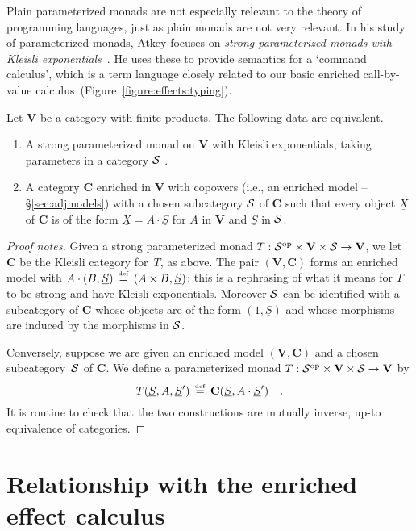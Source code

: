 \documentclass{LMCS}
\newenvironment{proofnotes}{\begin{proof}[Proof notes]}{\end{proof}}
\newcommand{\comptype}[1]{\underline{#1}}
\newcommand{\algX}{{\comptype{X}}}
\newcommand{\VCat}{\fixedcatfont{V}} \newcommand{\CCat}{\fixedcatfont{C}} \newcommand{\DCat}{\fixedcatfont{D}}
\newcommand{\ltensor}[2]{#1 \cdot #2}
\newcommand{\fixedcatfont}{\mathbf}
\newcommand{\stateobj}{{\underline{S}}}
\newcommand{\opcat}[1]{#1^{\mathrm{op}}}
\newcommand{\defeq}{\mathrel{\,\stackrel{\mbox{\tiny{$\mathrm{def}$}}}=\,}}
\begin{document}
Plain parameterized monads are not especially relevant to 
the theory of programming languages,
just as plain monads are not very relevant.
In his study of parameterized monads, 
Atkey focuses on
\emph{strong parameterized monads with Kleisli exponentials}~\cite[\S 2.4.1]{a-parammonad}.
He uses these to provide
semantics for a `command calculus', 
which is a term language closely related to our
basic enriched call-by-value calculus~(Figure~\ref{figure:effects:typing}).
\begin{prop} Let $\VCat$ be a category with finite products.
The following data are equivalent.
\begin{enumerate}
\item A strong parameterized monad on $\VCat$ with Kleisli exponentials,
taking parameters in a category $\mathcal S$ \cite[\S 2.4.1]{a-parammonad}.
\item A category $\CCat$ enriched in $\VCat$ with copowers 
(i.e., an enriched model -- \S\ref{sec:adjmodels}) 
with a chosen subcategory $\mathcal S$ of $\CCat$
such that every object $\algX$ of $\CCat$ is of the 
form $\algX= \ltensor A \stateobj$ for $A$ in $\VCat$ and $\stateobj$ in $\mathcal S$.
\end{enumerate}
\end{prop}
\begin{proofnotes}
Given a strong parameterized monad 
$T:\opcat\SCat\times\VCat\times\SCat\to\VCat$, we 
let $\CCat$ be the Kleisli category for~$T$, as above.
The pair $(\VCat,\CCat)$ forms an enriched model
with $\ltensor A{(B,\stateobj)}\defeq (A\times B,\stateobj)$:
this is a rephrasing of
what it means for $T$ to be strong and 
have Kleisli exponentials. 
Moreover $\mathcal S$ can be identified with a subcategory of $\CCat$ 
whose objects are of the form $(1,\stateobj)$
and whose morphisms are induced by the morphisms in $\mathcal S$.

Conversely, suppose we are given an enriched model $(\VCat,\CCat)$
and a chosen subcategory~$\mathcal S$ of $\CCat$. 
We define a parameterized monad
$T:\opcat\SCat\times\VCat\times \SCat\to \VCat$ 
by 
\[
T(\stateobj,A,\stateobj') \defeq \CCat(\stateobj,\ltensor A \stateobj')\quad\text.\]
It is routine to check that the two constructions are mutually inverse,
up-to equivalence of categories. 
\end{proofnotes}

\section{Relationship with the enriched effect calculus}
\label{sec:ecbvtoeec}
\end{document}
